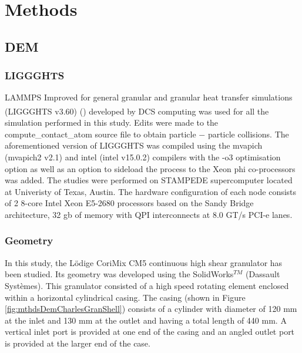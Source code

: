 \documentclass[preprint,11pt,authoryear]{elsarticle}
\begin{document}
	
	
	\section{Methods}
	
	  \subsection{DEM}
	    \subsubsection{LIGGGHTS}
	    	\par LAMMPS Improved for general granular and granular heat transfer simulations (LIGGGHTS\textsuperscript{\textregistered} v3.60) (\cite{Kloss2012}) developed by DCS computing was used for all the simulation performed in this study. Edits were made to the compute\_contact\_atom source file to obtain particle $-$ particle collisions. The aforementioned version of LIGGGHTS was compiled using the mvapich (mvapich2 v2.1) and intel (intel v15.0.2) compilers with the -o3 optimisation option as well as an option to sideload the process to the Xeon phi co-processors was added. The studies were performed on STAMPEDE supercomputer located at Univeristy of Texas, Austin. The hardware configuration of each node consists of 2 8-core Intel Xeon E5-2680 processors based on the Sandy Bridge architecture, 32 gb of memory with QPI interconnects at 8.0 GT/s PCI-e lanes.

	        
	    \subsubsection{Geometry}    
	    
	    \par In this study, the L\"{o}dige CoriMix CM5 continuous high shear granulator has been studied. Its geometry was developed using the SolidWorks$^{TM}$ (Dassault Syst\`{e}mes). This granulator consisted of a high speed rotating element enclosed within a horizontal cylindrical casing. The casing (shown in Figure \ref{fig:mthdsDemCharlesGranShell}) consists of a cylinder with diameter of 120 mm at the inlet and 130 mm at the outlet and having a total length of 440 mm. A vertical inlet port is provided at one end of the casing and an angled outlet port is provided at the larger end of the case. 
	
\end{document}
